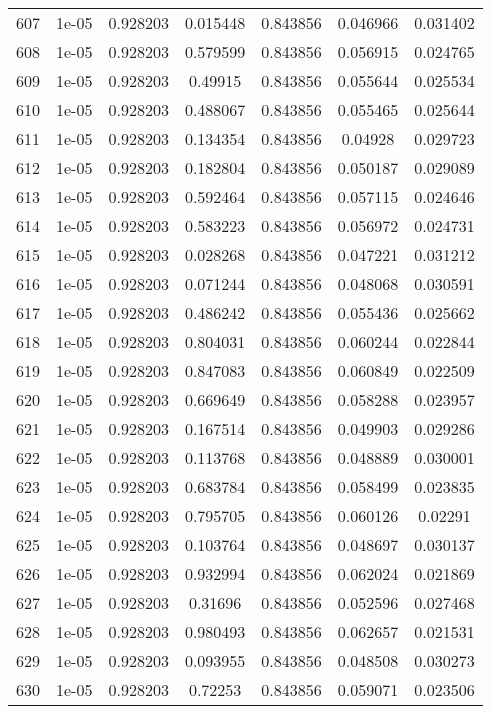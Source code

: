 \begin{table}
\begin{tabular*}{\linewidth}{c|c|c|c|c|c|c}
607 & 1e-05 & 0.928203 & 0.015448 & 0.843856 & 0.046966 & 0.031402\\
608 & 1e-05 & 0.928203 & 0.579599 & 0.843856 & 0.056915 & 0.024765\\
609 & 1e-05 & 0.928203 & 0.49915 & 0.843856 & 0.055644 & 0.025534\\
610 & 1e-05 & 0.928203 & 0.488067 & 0.843856 & 0.055465 & 0.025644\\
611 & 1e-05 & 0.928203 & 0.134354 & 0.843856 & 0.04928 & 0.029723\\
612 & 1e-05 & 0.928203 & 0.182804 & 0.843856 & 0.050187 & 0.029089\\
613 & 1e-05 & 0.928203 & 0.592464 & 0.843856 & 0.057115 & 0.024646\\
614 & 1e-05 & 0.928203 & 0.583223 & 0.843856 & 0.056972 & 0.024731\\
615 & 1e-05 & 0.928203 & 0.028268 & 0.843856 & 0.047221 & 0.031212\\
616 & 1e-05 & 0.928203 & 0.071244 & 0.843856 & 0.048068 & 0.030591\\
617 & 1e-05 & 0.928203 & 0.486242 & 0.843856 & 0.055436 & 0.025662\\
618 & 1e-05 & 0.928203 & 0.804031 & 0.843856 & 0.060244 & 0.022844\\
619 & 1e-05 & 0.928203 & 0.847083 & 0.843856 & 0.060849 & 0.022509\\
620 & 1e-05 & 0.928203 & 0.669649 & 0.843856 & 0.058288 & 0.023957\\
621 & 1e-05 & 0.928203 & 0.167514 & 0.843856 & 0.049903 & 0.029286\\
622 & 1e-05 & 0.928203 & 0.113768 & 0.843856 & 0.048889 & 0.030001\\
623 & 1e-05 & 0.928203 & 0.683784 & 0.843856 & 0.058499 & 0.023835\\
624 & 1e-05 & 0.928203 & 0.795705 & 0.843856 & 0.060126 & 0.02291\\
625 & 1e-05 & 0.928203 & 0.103764 & 0.843856 & 0.048697 & 0.030137\\
626 & 1e-05 & 0.928203 & 0.932994 & 0.843856 & 0.062024 & 0.021869\\
627 & 1e-05 & 0.928203 & 0.31696 & 0.843856 & 0.052596 & 0.027468\\
628 & 1e-05 & 0.928203 & 0.980493 & 0.843856 & 0.062657 & 0.021531\\
629 & 1e-05 & 0.928203 & 0.093955 & 0.843856 & 0.048508 & 0.030273\\
630 & 1e-05 & 0.928203 & 0.72253 & 0.843856 & 0.059071 & 0.023506\\
\end{tabular*}
\end{table}

